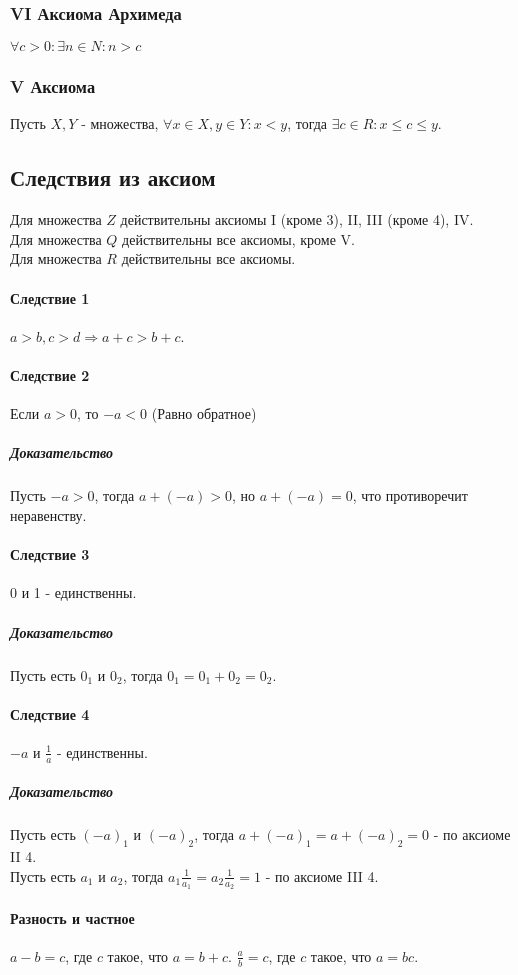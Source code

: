 \documentclass[10pt]{article}
\begin{document}
			\subsubsection{VI Аксиома Архимеда}
			$\forall c > 0 : \exists n \in N : n > c$
			\subsubsection{V Аксиома}
			Пусть $X, Y$ - множества, $\forall x \in X, y \in Y : x < y$, тогда $\exists c \in R : x \le c \le y$.
		\subsection{Следствия из аксиом}
		Для множества $Z$ действительны аксиомы I (кроме 3), II, III (кроме 4), IV.\\
		Для множества $Q$ действительны все аксиомы, кроме V.\\
		Для множества $R$ действительны все аксиомы.
			\paragraph{Следствие 1} $a > b, c > d \Rightarrow a + c > b + c$.
			\paragraph{Следствие 2} Если $a > 0$, то $-a < 0$ (Равно обратное)
			\subparagraph{Доказательство} Пусть $-a > 0$, тогда $a + (-a) > 0$, но $a + (-a) = 0$, что противоречит неравенству.
			\paragraph{Следствие 3} 0 и 1 - единственны.
			\subparagraph{Доказательство} Пусть есть $0_1$ и $0_2$, тогда $0_1 = 0_1 + 0_2 = 0_2$.
			\paragraph{Следствие 4} $-a$ и $\frac{1}{a}$ - единственны.
			\subparagraph{Доказательство} Пусть есть $(-a)_1$ и $(-a)_2$, тогда $a + (-a)_1 = a + (-a)_2 = 0$ - по аксиоме II 4. \\
			Пусть есть $a_1$ и $a_2$, тогда $a_1\frac{1}{a_1} = a_2\frac{1}{a_2} = 1$ - по аксиоме III 4.
			\paragraph{Разность и частное} $a - b = c$, где $c$ такое, что $a = b+c$. $\frac{a}{b} = c$, где $c$ такое, что $a = bc$.
\end{document}
